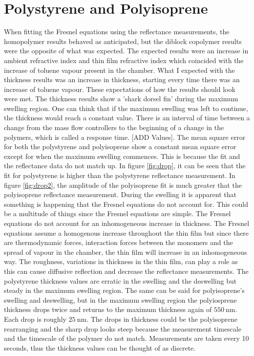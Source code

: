 \documentclass[MasterThesisMain.tex]{subfiles}
\begin{document}
\section{Polystyrene and Polyisoprene}
When fitting the Fresnel equations using the reflectance measurements, the homopolymer results behaved as anticipated, but the diblock copolymer results were the opposite of what was expected. The expected results were an increase in ambient refractive index and thin film refractive index which coincided with the increase of toluene vapour present in the chamber. What I expected with the thickness results was an increase in thickness, starting every time there was an increase of toluene vapour. These expectations of how the results should look were met. The thickness results show a 'shark dorsel fin' during the maximum swelling region. One can think that if the maximum swelling was left to continue, the thickness would reach a constant value. There is an interval of time between a change from the mass flow controllers to the beginning of a change in the polymers, which is called a response time. [ADD Values]. The mean square error for both the polystyrene and polyisoprene show a constant mean square error except for when the maximum swelling commences. This is because the fit and the reflectance data do not match up. In figure \ref{fig:drop}, it can be seen that the fit for polystyrene is higher than the polystyrene reflectance measurement. In figure \ref{fig:drop2}, the amplitude of the polyisoprene fit is much greater that the polyisoprene reflectance measurement. During the swelling it is apparent that something is happening that the Fresnel equations do not account for. This could be a multitude of things since the Fresnel equations are simple. The Fresnel equations do not account for an inhomogeneous increase in thickness. The Fresnel equations assume a homogenous increase throughout the thin film but since there are thermodynamic forces, interaction forces between the monomers and the spread of vapour in the chamber, the thin film will increase in an inhomogeneous way. The roughness, variations in thickness in the thin film, can play a role as this can cause diffusive reflection and decrease the reflectance measurements. The polystyrene thickness values are erratic in the swelling and the deswelling but steady in the maximum swelling region. The same can be said for polyisoprene's swelling and deswelling, but in the maximum swelling region the polyiosprene thickness drops twice and returns to the maximum thickness again of $\SI{550}{\nano\meter}$. Each drop is roughly $\SI{25}{\nano\meter}$. The drops in thickness could be the polyisoprene rearranging and the sharp drop looks steep because the measurement timescale and the timescale of the polymer do not match. Measurements are taken every 10 seconds, thus the thickness values can be thought of as discrete.
\end{document}
